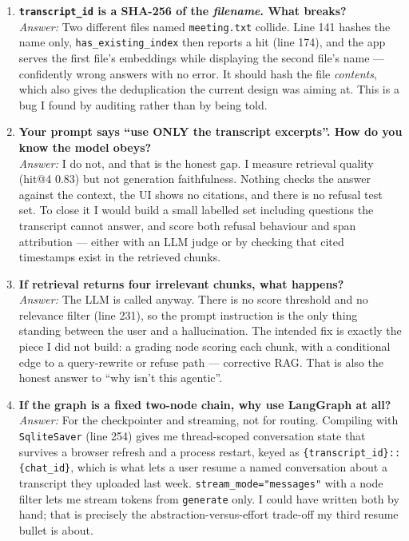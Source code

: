 \documentclass[11pt,a4paper]{article}
\begin{document}
\begin{enumerate}[leftmargin=*,itemsep=6pt]
\item \textbf{\texttt{transcript\_id} is a SHA-256 of the \emph{filename}. What
breaks?}\\
\emph{Answer:} Two different files named \texttt{meeting.txt} collide. Line 141
hashes the name only, \texttt{has\_existing\_index} then reports a hit (line 174),
and the app serves the first file's embeddings while displaying the second file's
name --- confidently wrong answers with no error. It should hash the file
\emph{contents}, which also gives the deduplication the current design was aiming
at. This is a bug I found by auditing rather than by being told.

\item \textbf{Your prompt says ``use ONLY the transcript excerpts''. How do you
know the model obeys?}\\
\emph{Answer:} I do not, and that is the honest gap. I measure retrieval quality
(hit@4 0.83) but not generation faithfulness. Nothing checks the answer against the
context, the UI shows no citations, and there is no refusal test set. To close it I
would build a small labelled set including questions the transcript cannot answer,
and score both refusal behaviour and span attribution --- either with an LLM judge
or by checking that cited timestamps exist in the retrieved chunks.

\item \textbf{If retrieval returns four irrelevant chunks, what happens?}\\
\emph{Answer:} The LLM is called anyway. There is no score threshold and no
relevance filter (line 231), so the prompt instruction is the only thing standing
between the user and a hallucination. The intended fix is exactly the piece I did
not build: a grading node scoring each chunk, with a conditional edge to a
query-rewrite or refuse path --- corrective RAG. That is also the honest answer to
``why isn't this agentic''.

\item \textbf{If the graph is a fixed two-node chain, why use LangGraph at all?}\\
\emph{Answer:} For the checkpointer and streaming, not for routing. Compiling with
\texttt{SqliteSaver} (line 254) gives me thread-scoped conversation state that
survives a browser refresh and a process restart, keyed as
\texttt{\{transcript\_id\}::\{chat\_id\}}, which is what lets a user resume a named
conversation about a transcript they uploaded last week. \texttt{stream\_mode="messages"}
with a node filter lets me stream tokens from \texttt{generate} only. I could have
written both by hand; that is precisely the abstraction-versus-effort trade-off my
third resume bullet is about.


\end{enumerate}
\end{document}
